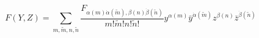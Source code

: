 \begin{equation}\label{expansion}
F(Y,Z)=\sum_{m,\tilde{m},n,\tilde{n}}
\frac{F_{\alpha(m)\dot{\alpha}(\tilde{m}),
\beta(n)\dot{\beta}(\tilde{n})}}
{m!\tilde{m}!n!\tilde{n}!}
y^{\alpha(m)}\bar{y}^{\dot{\alpha}(\tilde{m})}z^{\beta(n)}
\bar{z}^{\dot{\beta}(\tilde{n})}
\end{equation}

